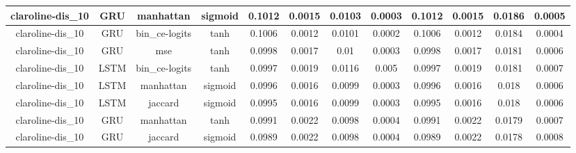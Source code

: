 \documentclass{article}%
\begin{document}
\begin{tabular}{|c|c|c|c|c|c|c|c|c|c|c|c|}
\hline%
claroline{-}dis\_10&GRU&manhattan&sigmoid&0.1012&0.0015&0.0103&0.0003&0.1012&0.0015&0.0186&0.0005\\%
\hline%
claroline{-}dis\_10&GRU&bin\_ce{-}logits&tanh&0.1006&0.0012&0.0101&0.0002&0.1006&0.0012&0.0184&0.0004\\%
\hline%
claroline{-}dis\_10&GRU&mse&tanh&0.0998&0.0017&0.01&0.0003&0.0998&0.0017&0.0181&0.0006\\%
\hline%
claroline{-}dis\_10&LSTM&bin\_ce{-}logits&tanh&0.0997&0.0019&0.0116&0.005&0.0997&0.0019&0.0181&0.0007\\%
\hline%
claroline{-}dis\_10&LSTM&manhattan&sigmoid&0.0996&0.0016&0.0099&0.0003&0.0996&0.0016&0.018&0.0006\\%
\hline%
claroline{-}dis\_10&LSTM&jaccard&sigmoid&0.0995&0.0016&0.0099&0.0003&0.0995&0.0016&0.018&0.0006\\%
\hline%
claroline{-}dis\_10&GRU&manhattan&tanh&0.0991&0.0022&0.0098&0.0004&0.0991&0.0022&0.0179&0.0007\\%
\hline%
claroline{-}dis\_10&GRU&jaccard&sigmoid&0.0989&0.0022&0.0098&0.0004&0.0989&0.0022&0.0178&0.0008\\%
\hline%
\end{tabular}

%
\newpage%
\end{document}
